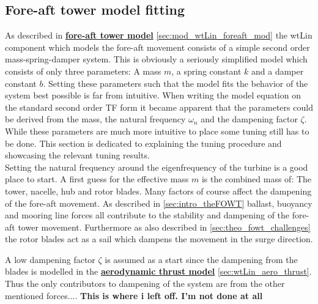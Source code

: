 \subsection{Fore-aft tower model fitting} \label{sec:mod_foreaft_fitting}
As described in \hyperref[sec:mod_wtLin_foreaft_mod]{\textbf{fore-aft tower model}} \cref{sec:mod_wtLin_foreaft_mod} the wtLin component which models the fore-aft movement consists of a simple second order mass-spring-damper system. This is obviously a seriously simplified model which consists of only three parameters: A mass $ m $, a spring constant $ k $ and a damper constant $ b $. Setting these parameters such that the model fits the behavior of the system best possible is far from intuitive. When writing the model equation on the standard second order TF form it became apparent that the parameters could be derived from the mass, the natural frequency $ \omega_n $ and the dampening factor $ \zeta $. While these parameters are much more intuitive to place some tuning still has to be done. This section is dedicated to explaining the tuning procedure and showcasing the relevant tuning results.\\

Setting the natural frequency around the eigenfrequency of the turbine is a good place to start. A first guess for the effective mass $ m $ is the combined mass of: The tower, nacelle, hub and rotor blades. Many factors of course affect the dampening of the fore-aft movement. As described in \cref{sec:intro_theFOWT} ballast, buoyancy and mooring line forces all contribute to the stability and dampening of the fore-aft tower movement. Furthermore as also described in \cref{sec:theo_fowt_challenges} the rotor blades act as a sail which dampens the movement in the surge direction.

A low dampening factor $ \zeta $ is assumed as a start since the dampening from the blades is modelled in the \hyperref[sec:wtLin_aero_thrust]{\textbf{aerodynamic thrust model}} \cref{sec:wtLin_aero_thrust}. Thus the only contributors to dampening of the system are from the other mentioned forces.... \textbf{This is where i left off. I'm not done at all}

